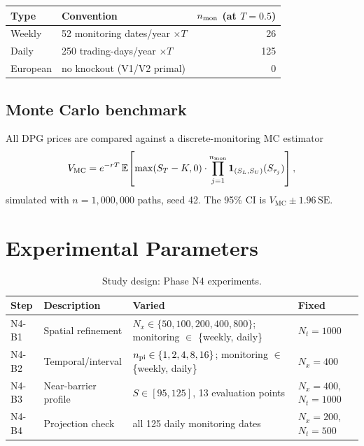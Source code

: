 \documentclass[11pt,a4paper]{article}
\newcommand{\Nx}{N_x}
\newcommand{\Nt}{N_t}
\newcommand{\npi}{n_{\rm pi}}
\newcommand{\MC}{\mathrm{MC}}
\newcommand{\SL}{S_L}
\newcommand{\SU}{S_U}
\begin{document}
\begin{center}
\begin{tabular}{llr}
\toprule
Type & Convention & $n_{\rm mon}$ (at $T=0.5$) \\
\midrule
Weekly  & 52 monitoring dates/year $\times T$ & 26 \\
Daily   & 250 trading-days/year $\times T$    & 125 \\
European & no knockout (V1/V2 primal)         & 0 \\
\bottomrule
\end{tabular}
\end{center}

\subsection{Monte Carlo benchmark}

All DPG prices are compared against a discrete-monitoring MC estimator
\begin{equation}
  V_{\MC} = e^{-rT}\,\mathbb{E}\!\left[\max(S_T - K, 0)\cdot
            \prod_{j=1}^{n_{\rm mon}}\mathbf{1}_{(\SL,\SU)}(S_{\tau_j})\right],
  \label{eq:mc}
\end{equation}
simulated with $n = 1{,}000{,}000$ paths, seed 42.
The 95\% CI is $V_{\MC} \pm 1.96\,\mathrm{SE}$.

\section{Experimental Parameters}

\begin{table}[htbp]
\centering
\caption{Study design: Phase N4 experiments.}
\label{tab:params}
\small
\begin{tabular}{@{}p{1.3cm}p{2.8cm}p{5.8cm}p{3.6cm}@{}}
\toprule
Step & Description & Varied & Fixed \\
\midrule
N4-B1 & Spatial refinement &
  $\Nx \in \{50, 100, 200, 400, 800\}$;
  monitoring $\in$ \{weekly, daily\} &
  $\Nt = 1000$ \\[4pt]
N4-B2 & Temporal/interval &
  $\npi \in \{1, 2, 4, 8, 16\}$;
  monitoring $\in$ \{weekly, daily\} &
  $\Nx = 400$ \\[4pt]
N4-B3 & Near-barrier profile &
  $S \in [95, 125]$, 13 evaluation points &
  $\Nx=400$, $\Nt=1000$ \\[4pt]
N4-B4 & Projection check &
  all 125 daily monitoring dates &
  $\Nx=200$, $\Nt=500$ \\
\bottomrule
\end{tabular}
\end{table}
\end{document}
